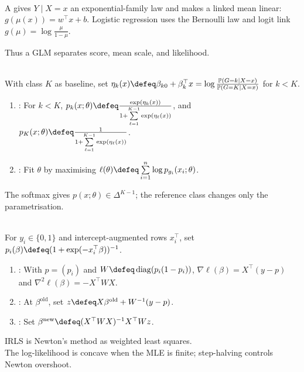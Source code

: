 \begin{definition} \label{def:sl-generalized-linear-model} \\
A  gives $Y\mid X=x$ an exponential-family law and makes a linked mean linear:\\
$g(\mu(x))=w^\top x+b$. Logistic regression uses the Bernoulli law and logit link $g(\mu)=\log\frac{\mu}{1-\mu}$.
\end{definition}

Thus a GLM separates score, mean scale, and likelihood.

\begin{definition} \label{def:sl-multiclass-logistic-regression} \\
With class $K$ as baseline, set $\eta_k(x)\defeq\beta_{k0}+\beta_k^\top x=\log\frac{\mathbb{P}(G=k\mid X=x)}{\mathbb{P}(G=K\mid X=x)}$ for $k<K$.
\begin{enumerate}[label=(\roman*)]
\setlength{\itemsep}{0pt}
\item {}: For $k<K$, $p_k(x;\theta)\defeq\frac{\exp(\eta_k(x))}{1+\sum\limits_{\ell=1}^{K-1}\exp(\eta_\ell(x))}$, and $p_K(x;\theta)\defeq\frac{1}{1+\sum\limits_{\ell=1}^{K-1}\exp(\eta_\ell(x))}$.
\item {}: Fit $\theta$ by maximising $\ell(\theta)\defeq\sum\limits_{i=1}^{n}\log p_{g_i}(x_i;\theta)$.
\end{enumerate}
The softmax gives $p(x;\theta)\in\Delta^{K-1}$; the reference class changes only the parametrisation.
\end{definition}

\begin{method} \label{meth:sl-logistic-irls} \\
For $y_i\in\{0,1\}$ and intercept-augmented rows $x_i^\top$, set $p_i(\beta)\defeq(1+\exp(-x_i^\top\beta))^{-1}$.
\begin{enumerate}[label=(\roman*)]
\setlength{\itemsep}{0pt}
\item {}: With $p=(p_i)$ and $W\defeq\operatorname{diag}(p_i(1-p_i))$, $\nabla\ell(\beta)=X^\top(y-p)$ and $\nabla^2\ell(\beta)=-X^\top W X$.
\item {}: At $\beta^{\mathrm{old}}$, set $z\defeq X\beta^{\mathrm{old}}+W^{-1}(y-p)$.
\item {}: Set $\beta^{\mathrm{new}}\defeq(X^\top W X)^{-1}X^\top Wz$.
\end{enumerate}
IRLS is Newton's method as weighted least squares.\\
The log-likelihood is concave when the MLE is finite; step-halving controls Newton overshoot.
\end{method}


